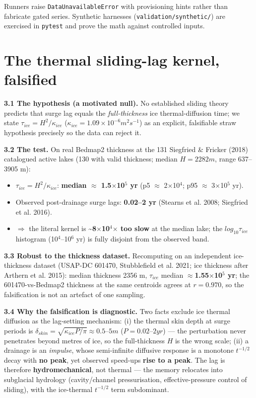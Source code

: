 \documentclass[tc, manuscript]{copernicus}
\begin{document}
Runners raise \texttt{DataUnavailableError} with provisioning hints rather than fabricate gated series. Synthetic harnesses (\texttt{validation/\allowbreak{}synthetic/\allowbreak{}}) are exercised in \texttt{pytest} and prove the math against controlled inputs.

\section{The thermal sliding-lag kernel, falsified}

\textbf{3.1 The hypothesis (a motivated null).} No established sliding theory predicts that surge lag equals the \emph{full-thickness} ice thermal-diffusion time; we state $\tau _{ice} = H^{2}/\kappa _{ice}$ ($\kappa _{ice}=1.09\times 10^{-6} m^{2} s^{-1}$) as an explicit, falsifiable straw hypothesis precisely so the data can reject it.

\textbf{3.2 The test.} On real Bedmap2 thickness at the 131 Siegfried \& Fricker (2018) catalogued active lakes (130 with valid thickness; median $H=2282 m$, range 637–3905 m):

\begin{itemize}
\item $\tau _{ice} = H^{2}/\kappa _{ice}$: \textbf{median \ensuremath{\approx} 1.5\ensuremath{\times}10\ensuremath{^{5}} yr} (p5 \ensuremath{\approx} 2\ensuremath{\times}10\ensuremath{^{4}}; p95 \ensuremath{\approx} 3\ensuremath{\times}10\ensuremath{^{5}} yr).
\item Observed post-drainage surge lags: \textbf{0.02–2 yr} (Stearns et al. 2008; Siegfried et al. 2016).
\item \ensuremath{\Rightarrow} the literal kernel is \textbf{\textasciitilde{}8\ensuremath{\times}10\ensuremath{^{4}}\ensuremath{\times} too slow} at the median lake; the $log_{10} \tau _{ice}$ histogram (10\ensuremath{^{4}}–10\ensuremath{^{6}} yr) is fully disjoint from the observed band.
\end{itemize}

\textbf{3.3 Robust to the thickness dataset.} Recomputing on an independent ice-thickness dataset (USAP-DC 601470, Stubblefield et al. 2021; ice thickness after Arthern et al. 2015): median thickness 2356 m, $\tau _{ice}$ median \textbf{\ensuremath{\approx}1.55\ensuremath{\times}10\ensuremath{^{5}} yr}; the 601470-vs-Bedmap2 thickness at the same centroids agrees at \textbf{$r=0.970$}, so the falsification is not an artefact of one sampling.

\textbf{3.4 Why the falsification is diagnostic.} Two facts exclude ice thermal diffusion as the lag-setting mechanism: (i) the thermal skin depth at surge periods is $\delta _{skin}=\sqrt{\kappa _{ice} P/\pi }\approx 0.5\mbox{--}5 m$ ($P=0.02\mbox{--}2 yr$) — the perturbation never penetrates beyond metres of ice, so the full-thickness $H$ is the wrong scale; (ii) a drainage is an \emph{impulse}, whose semi-infinite diffusive response is a monotone $t^{-1/2}$ decay with \textbf{no peak}, yet observed speed-ups \textbf{rise to a peak}. The lag is therefore \textbf{hydromechanical}, not thermal — the memory relocates into subglacial hydrology (cavity/channel pressurisation, effective-pressure control of sliding), with the ice-thermal $t^{-1/2}$ term subdominant.
\end{document}

